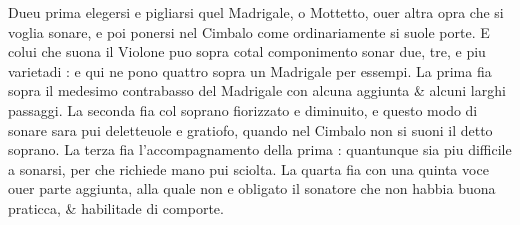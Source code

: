 Dueu prima elegersi e pigliarsi quel Madrigale, o Mottetto, ouer altra opra che si voglia sonare, e poi ponersi nel Cimbalo come ordinariamente si suole porte. E colui che suona il Violone puo sopra cotal componimento sonar due, tre, e piu varietadi : e qui ne pono quattro sopra un Madrigale per essempi. La prima fia sopra il medesimo contrabasso del Madrigale con alcuna aggiunta \& alcuni larghi passaggi. La seconda fia col soprano fiorizzato e diminuito, e questo modo di sonare sara pui deletteuole e gratiofo, quando nel Cimbalo non si suoni il detto soprano. La terza fia l'accompagnamento della prima : quantunque sia piu difficile a sonarsi, per che richiede mano pui sciolta. La quarta fia con una quinta voce ouer parte aggiunta, alla quale non e obligato il sonatore che non habbia buona praticca, \& habilitade di comporte.
